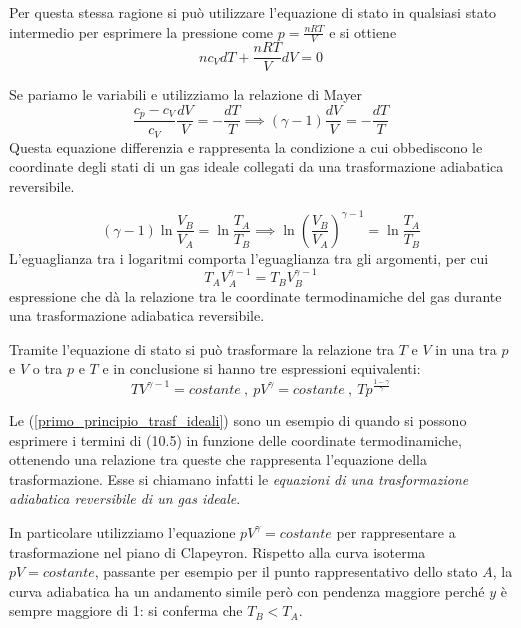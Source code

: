 \documentclass[class=book, crop=false, oneside, 12pt]{standalone}
\begin{document}
Per questa stessa ragione si può utilizzare l'equazione di stato in qualsiasi stato intermedio per esprimere la pressione come \(p = \frac{n R T}{V}\) e si ottiene
\begin{equation*}
    n c_V d T + \frac{n R T}{V} d V = 0
\end{equation*}

Se pariamo le variabili e utilizziamo la relazione di Mayer
\begin{equation*}
    \frac{c_p -c_V}{c_V} \frac{d V}{V} = - \frac{d T}{T} \implies (\gamma - 1) \frac{d V}{V} = - \frac{d T}{T}
\end{equation*}
Questa equazione differenzia e rappresenta la condizione a cui obbediscono le coordinate degli stati di un gas ideale collegati da una trasformazione adiabatica reversibile.

\begin{equation*}
    (\gamma - 1) \ln \frac{V_{B}}{V_A} = \ln \frac{T_A}{T_B} \implies \ln \left(\frac{V_B}{V_A}\right)^{\gamma - 1 } = \ln \frac{T_A}{T_B}
\end{equation*}
L'eguaglianza tra i logaritmi comporta l'eguaglianza tra gli argomenti, per cui
\begin{equation*}
    T_A V_A^{\gamma - 1} = T_B V_B^{\gamma - 1}
\end{equation*}
espressione che dà la relazione tra le coordinate termodinamiche del gas durante una trasformazione adiabatica reversibile. 

Tramite l'equazione di stato si può trasformare la relazione tra \(T\) e \(V\) in una tra \(p\) e \(V\) o tra \(p\) e \(T\) e in conclusione si hanno tre espressioni equivalenti:
\begin{equation}
    T V^{\gamma - 1 } = costante \ , \ pV^{\gamma} = costante \ , \ T p^{\frac{1 - \gamma}{\gamma}}
\end{equation}

Le (\ref{primo_principio_trasf_ideali}) sono un esempio di quando si possono esprimere i termini di (10.5) in funzione delle coordinate termodinamiche, ottenendo una relazione tra queste che rappresenta l'equazione della trasformazione. %
Esse si chiamano infatti le \emph{equazioni di una trasformazione adiabatica reversibile di un gas ideale}.

In particolare utilizziamo l'equazione \(p V^{\gamma} = costante\) per rappresentare a trasformazione nel piano di Clapeyron. 
Rispetto alla curva isoterma \(p V = costante\), passante per esempio per il punto rappresentativo dello stato \(A\), la curva adiabatica ha un andamento simile però con pendenza maggiore perché \(y\) è sempre maggiore di 1:  si conferma che \(T_B < T_A\).
\end{document}

